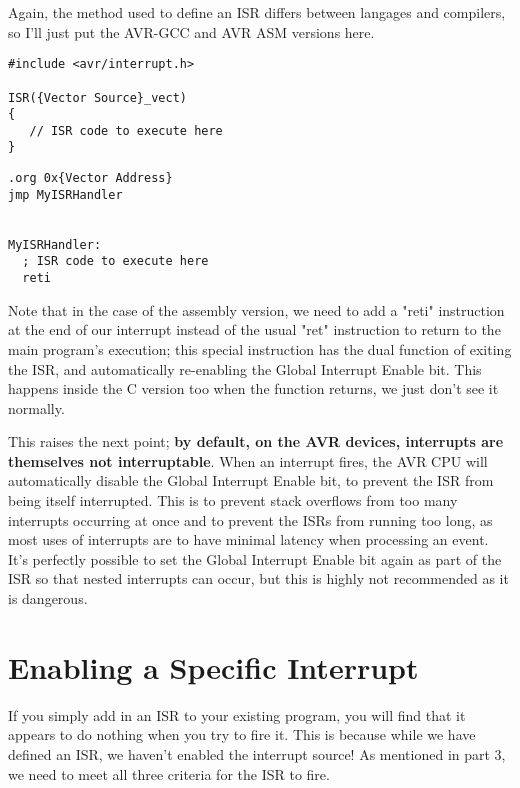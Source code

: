 \documentclass[a4paper,oneside,notitlepage]{book}
\begin{document}
Again, the method used to define an ISR differs between langages and compilers, so I'll just put the AVR-GCC and AVR ASM versions here.

\begin{center}
\begin{lstlisting}
#include <avr/interrupt.h>

ISR({Vector Source}_vect)
{
   // ISR code to execute here
} 
\end{lstlisting}
\end{center}

\begin{center}
\begin{lstlisting}
.org 0x{Vector Address}
jmp MyISRHandler


MyISRHandler:
  ; ISR code to execute here
  reti 
\end{lstlisting}
\end{center}

Note that in the case of the assembly version, we need to add a "reti" instruction at the end of our interrupt instead of the usual "ret" instruction to return to the main program's execution; this special instruction has the dual function of exiting the ISR, and automatically re-enabling the Global Interrupt Enable bit. This happens inside the C version too when the function returns, we just don't see it normally.

This raises the next point; \textbf{by default, on the AVR devices, interrupts are themselves not interruptable}. When an interrupt fires, the AVR CPU will automatically disable the Global Interrupt Enable bit, to prevent the ISR from being itself interrupted. This is to prevent stack overflows from too many interrupts occurring at once and to prevent the ISRs from running too long, as most uses of interrupts are to have minimal latency when processing an event. It's perfectly possible to set the Global Interrupt Enable bit again as part of the ISR so that nested interrupts can occur, but this is highly not recommended as it is dangerous. 


\label{chp:EnableInt}
\chapter{Enabling a Specific Interrupt}

If you simply add in an ISR to your existing program, you will find that it appears to do nothing when you try to fire it. This is because while we have defined an ISR, we haven't enabled the interrupt source! As mentioned in part 3, we need to meet all three criteria for the ISR to fire.
\end{document}
